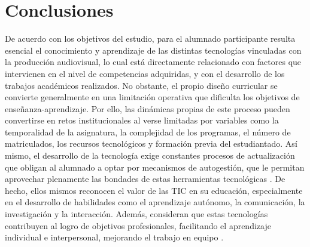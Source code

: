 \documentclass[spanish]{textolivre}
\begin{document}
\section{Conclusiones}\label{sec-links}
De acuerdo con los objetivos del estudio, para el alumnado participante resulta esencial el conocimiento y aprendizaje de las distintas tecnologías vinculadas con la producción audiovisual, lo cual está directamente relacionado con factores que intervienen en el nivel de competencias adquiridas, y con el desarrollo de los trabajos académicos realizados. No obstante, el propio diseño curricular se convierte generalmente en una limitación operativa que dificulta los objetivos de enseñanza-aprendizaje. Por ello, las dinámicas propias de este proceso pueden convertirse en retos institucionales al verse limitadas por variables como la temporalidad de la asignatura, la complejidad de los programas, el número de matriculados, los recursos tecnológicos y formación previa del estudiantado. Así mismo, el desarrollo de la tecnología exige constantes procesos de actualización que obligan al alumnado a optar por mecanismos de autogestión, que le permitan aprovechar plenamente las bondades de estas herramientas tecnológicas \cite{granados_maguino_tecnologien_2020}. De hecho, ellos mismos reconocen el valor de las TIC en su educación, especialmente en el desarrollo de habilidades como el aprendizaje autónomo, la comunicación, la investigación y la interacción. Además, consideran que estas tecnologías contribuyen al logro de objetivos profesionales, facilitando el aprendizaje individual e interpersonal, mejorando el trabajo en equipo \cite{espinel_armas_tecnologien_2020}.
\end{document}
